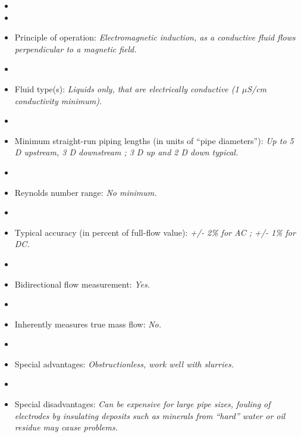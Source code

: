 \documentclass[12pt,a4paper]{article}
\begin{document}
\begin{itemize}
\goodbreak
\item{} 
\vskip 5pt
\item\item{} Principle of operation: {\it Electromagnetic induction, as a conductive fluid flows perpendicular to a magnetic field.}
\vskip 5pt
\item\item{} Fluid type(s): {\it Liquids only, that are electrically conductive (1 $\mu$S/cm conductivity minimum).}
\vskip 5pt
\item\item{} Minimum straight-run piping lengths (in units of ``pipe diameters''): {\it Up to 5 D upstream, 3 D downstream ; 3 D up and 2 D down typical.}
\vskip 5pt
\item\item{} Reynolds number range: {\it No minimum.}
\vskip 5pt
\item\item{} Typical accuracy (in percent of full-flow value): {\it +/- 2\% for AC ; +/- 1\% for DC.}
\vskip 5pt
\item\item{} Bidirectional flow measurement: {\it Yes.}
\vskip 5pt
\item\item{} Inherently measures true mass flow: {\it No.}
\vskip 5pt
\item\item{} Special advantages: {\it Obstructionless, work well with slurries.}
\vskip 5pt
\item\item{} Special disadvantages: {\it Can be expensive for large pipe sizes, fouling of electrodes by insulating deposits such as minerals from ``hard'' water or oil residue may cause problems.}
\end{itemize}
\end{document}
